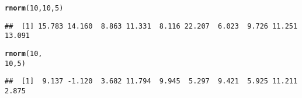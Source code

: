 \documentclass{article}\usepackage[]{graphicx}\usepackage[]{color}
\makeatletter
\newcommand{\hlnum}[1]{\textcolor[rgb]{0.686,0.059,0.569}{#1}}%
\newcommand{\hlstd}[1]{\textcolor[rgb]{0.345,0.345,0.345}{#1}}%
\newcommand{\hlkwd}[1]{\textcolor[rgb]{0.737,0.353,0.396}{\textbf{#1}}}%
\newenvironment{kframe}{%
 \def\at@end@of@kframe{}%
 \ifinner\ifhmode%
  \def\at@end@of@kframe{\end{minipage}}%
  \begin{minipage}{\columnwidth}%
 \fi\fi%
 \def\FrameCommand##1{\hskip\@totalleftmargin \hskip-\fboxsep
 \colorbox{shadecolor}{##1}\hskip-\fboxsep
     \hskip-\linewidth \hskip-\@totalleftmargin \hskip\columnwidth}%
 \MakeFramed {\advance\hsize-\width
   \@totalleftmargin\z@ \linewidth\hsize
   \@setminipage}}%
 {\par\unskip\endMakeFramed%
 \at@end@of@kframe}
\newenvironment{knitrout}{}{} %
\makeatother
\begin{document}
\begin{knitrout}
\color{fgcolor}\begin{kframe}
\begin{alltt}
\hlkwd{rnorm}\hlstd{(}\hlnum{10}\hlstd{,} \hlnum{10}\hlstd{,} \hlnum{5}\hlstd{)}
\end{alltt}
\begin{verbatim}
##  [1] 15.783 14.160  8.863 11.331  8.116 22.207  6.023  9.726 11.251 13.091
\end{verbatim}
\end{kframe}
\end{knitrout}


\begin{knitrout}
\color{fgcolor}\begin{kframe}
\begin{alltt}
\hlkwd{rnorm}\hlstd{(}\hlnum{10}\hlstd{,}
      \hlnum{10}\hlstd{,} \hlnum{5}\hlstd{)}
\end{alltt}
\begin{verbatim}
##  [1]  9.137 -1.120  3.682 11.794  9.945  5.297  9.421  5.925 11.211  2.875
\end{verbatim}
\end{kframe}
\end{knitrout}
\end{document}
